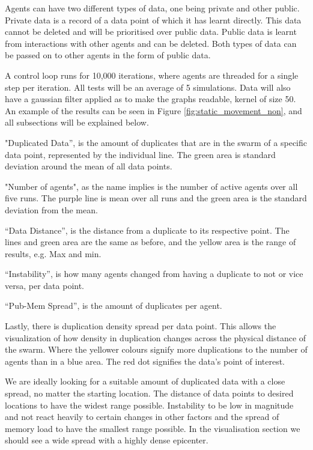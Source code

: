 \documentclass{UoYCSproject}
\begin{document}
Agents can have two different types of data, one being private and other public.
Private data is a record of a data point of which it has learnt directly.
This data cannot be deleted and will be prioritised over public data.
Public data is learnt from interactions with other agents and can be deleted.
Both types of data can be passed on to other agents in the form of public data.

A control loop runs for 10,000 iterations, where agents are threaded for a single step per iteration.
All tests will be an average of 5 simulations.
Data will also have a gaussian filter applied as to make the graphs readable, kernel of size 50.
An example of the results can be seen in Figure \ref{fig:static_movement_non}, and all subsections will be explained below.

"Duplicated Data”, is the amount of duplicates that are in the swarm of a specific data point, represented by the individual line.
The green area is standard deviation around the mean of all data points.

"Number of agents", as the name implies is the number of active agents over all five runs.
The purple line is mean over all runs and the green area is the standard deviation from the mean.

“Data Distance”, is the distance from a duplicate to its respective point.
The lines and green area are the same as before, and the yellow area is the range of results, e.g. Max and min.

“Instability”, is how many agents changed from having a duplicate to not or vice versa, per data point.

“Pub-Mem Spread”, is the amount of duplicates per agent.

Lastly, there is duplication density spread per data point.
This allows the visualization of how density in duplication changes across the physical distance of the swarm.
Where the yellower colours signify more duplications to the number of agents than in a blue area.
The red dot signifies the data’s point of interest.

We are ideally looking for a suitable amount of duplicated data with a close spread, no matter the starting location. 
The distance of data points to desired locations to have the widest range possible. 
Instability to be low in magnitude and not react heavily to certain changes in other factors and the spread of memory load to have the smallest range possible. 
In the visualisation section we should see a wide spread with a highly dense epicenter.
\end{document}
